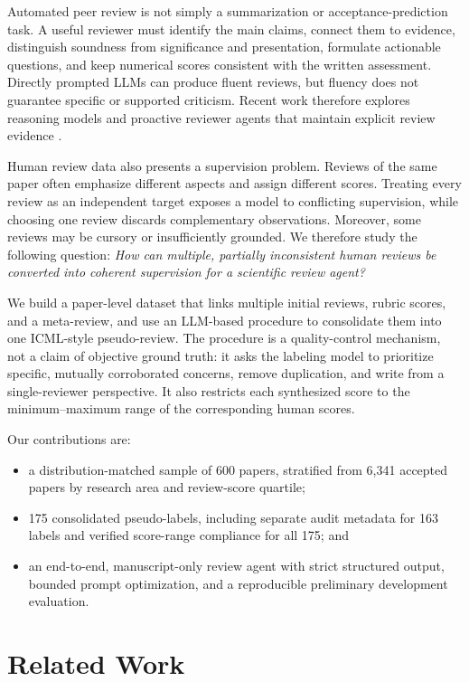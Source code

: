 \documentclass{article}
\begin{document}
Automated peer review is not simply a summarization or acceptance-prediction task. A useful reviewer must identify the main claims, connect them to evidence, distinguish soundness from significance and presentation, formulate actionable questions, and keep numerical scores consistent with the written assessment. Directly prompted LLMs can produce fluent reviews, but fluency does not guarantee specific or supported criticism. Recent work therefore explores reasoning models and proactive reviewer agents that maintain explicit review evidence \cite{zhang2025critical,fang2026proreviewer}.

Human review data also presents a supervision problem. Reviews of the same paper often emphasize different aspects and assign different scores. Treating every review as an independent target exposes a model to conflicting supervision, while choosing one review discards complementary observations. Moreover, some reviews may be cursory or insufficiently grounded. We therefore study the following question: \emph{How can multiple, partially inconsistent human reviews be converted into coherent supervision for a scientific review agent?}

We build a paper-level dataset that links multiple initial reviews, rubric scores, and a meta-review, and use an LLM-based procedure to consolidate them into one ICML-style pseudo-review. The procedure is a quality-control mechanism, not a claim of objective ground truth: it asks the labeling model to prioritize specific, mutually corroborated concerns, remove duplication, and write from a single-reviewer perspective. It also restricts each synthesized score to the minimum--maximum range of the corresponding human scores.

Our contributions are:
\begin{itemize}
  \item a distribution-matched sample of 600 papers, stratified from 6,341 accepted papers by research area and review-score quartile;
  \item 175 consolidated pseudo-labels, including separate audit metadata for 163 labels and verified score-range compliance for all 175; and
  \item an end-to-end, manuscript-only review agent with strict structured output, bounded prompt optimization, and a reproducible preliminary development evaluation.
\end{itemize}

\section{Related Work}
\end{document}
